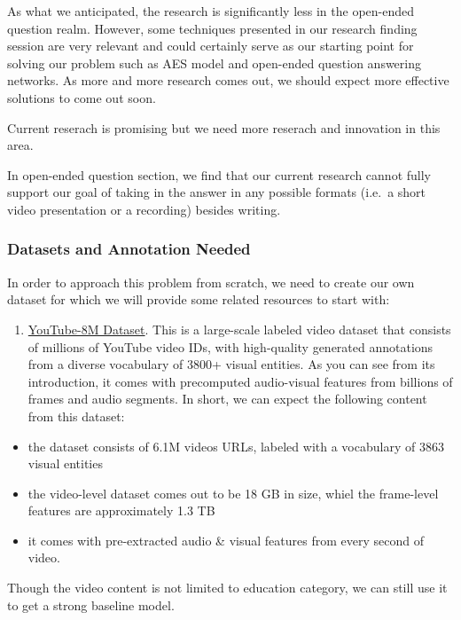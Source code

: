 \documentclass[]{book}
\providecommand{\tightlist}{%
  \setlength{\itemsep}{0pt}\setlength{\parskip}{0pt}}
\theoremstyle{definition}
\theoremstyle{definition}
\theoremstyle{definition}
\theoremstyle{remark}
\begin{document}
As what we anticipated, the research is significantly less in the
open-ended question realm. However, some techniques presented in our
research finding session are very relevant and could certainly serve as
our starting point for solving our problem such as AES model and
open-ended question answering networks. As more and more research comes
out, we should expect more effective solutions to come out soon.

Current reserach is promising but we need more reserach and innovation
in this area.

In open-ended question section, we find that our current research cannot
fully support our goal of taking in the answer in any possible formats
(i.e.~a short video presentation or a recording) besides writing.

\subsubsection{Datasets and Annotation
Needed}\label{datasets-and-annotation-needed}

In order to approach this problem from scratch, we need to create our
own dataset for which we will provide some related resources to start
with:

\begin{enumerate}
\def\labelenumi{\arabic{enumi}.}
\tightlist
\item
  \href{https://research.google.com/youtube8m/}{YouTube-8M Dataset}.
  This is a large-scale labeled video dataset that consists of millions
  of YouTube video IDs, with high-quality generated annotations from a
  diverse vocabulary of 3800+ visual entities. As you can see from its
  introduction, it comes with precomputed audio-visual features from
  billions of frames and audio segments. In short, we can expect the
  following content from this dataset:
\end{enumerate}

\begin{itemize}
\item
  the dataset consists of 6.1M videos URLs, labeled with a vocabulary of
  3863 visual entities
\item
  the video-level dataset comes out to be 18 GB in size, whiel the
  frame-level features are approximately 1.3 TB
\item
  it comes with pre-extracted audio \& visual features from every second
  of video.
\end{itemize}

Though the video content is not limited to education category, we can
still use it to get a strong baseline model.
\end{document}
